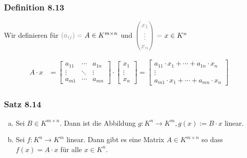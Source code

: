 \documentclass[a5paper, 10pt]{book}
\begin{document}
			\subsubsection{Definition 8.13}
				Wir definieren für ${\color{gray} (a_{ij}) =\ } A \in K^{m \times n}$ und ${\color{gray} \begin{pmatrix}
						x_1 \\ \vdots \\ x_n
					\end{pmatrix} =\ } x \in K^n$
				
					\begin{align}
						A \cdot x &= \begin{bmatrix}
							a_{11}	& \cdots	& a_{1n} \\
							\vdots	& \ddots	& \vdots \\
							a_{m1}	& \cdots	& a_{mn}
						\end{bmatrix} \cdot \begin{bmatrix}
							x_1 \\ \vdots \\ x_n
						\end{bmatrix} = \begin{bmatrix}
							a_{11} \cdot x_1 + \cdots + a_{1n} \cdot x_n \\
							\vdots \\
							a_{m1} \cdot x_1 + \cdots + a_{mn} \cdot x_n
						\end{bmatrix}
					\end{align}
			
			\subsubsection{Satz 8.14}
				\begin{enumerate}[a)]
					\item Sei $B \in K^{m \times n}$. Dann ist die Abbildung $g: K^n \to K^m, g(x) := B \cdot x$ linear.
					\item Sei $f: K^n \to K^m$ linear. Dann gibt es eine Matrix $A \in K^{m \times n}$ so dass $f(x) = A \cdot x$ für alle $x \in K^n$.
				\end{enumerate}
			
\end{document}
